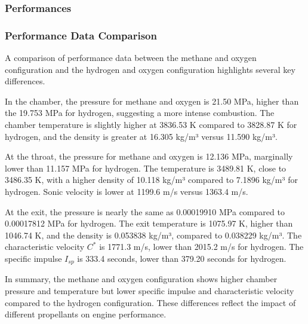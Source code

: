 \subsubsection{Performances}
\subsubsection{Performance Data Comparison}

A comparison of performance data between the methane and oxygen configuration and the hydrogen and oxygen configuration highlights several key differences.

In the chamber, the pressure for methane and oxygen is 21.50 MPa, higher than the 19.753 MPa for hydrogen, suggesting a more intense combustion. The chamber temperature is slightly higher at 3836.53 K compared to 3828.87 K for hydrogen, and the density is greater at 16.305 kg/m³ versus 11.590 kg/m³.

At the throat, the pressure for methane and oxygen is 12.136 MPa, marginally lower than 11.157 MPa for hydrogen. The temperature is 3489.81 K, close to 3486.35 K, with a higher density of 10.118 kg/m³ compared to 7.1896 kg/m³ for hydrogen. Sonic velocity is lower at 1199.6 m/s versus 1363.4 m/s.

At the exit, the pressure is nearly the same as 0.00019910 MPa compared to 0.00017812 MPa for hydrogen. The exit temperature is 1075.97 K, higher than 1046.74 K, and the density is 0.053838 kg/m³, compared to 0.038229 kg/m³. The characteristic velocity \( C^* \) is 1771.3 m/s, lower than 2015.2 m/s for hydrogen. The specific impulse \( I_{sp} \) is 333.4 seconds, lower than 379.20 seconds for hydrogen.

In summary, the methane and oxygen configuration shows higher chamber pressure and temperature but lower specific impulse and characteristic velocity compared to the hydrogen configuration. These differences reflect the impact of different propellants on engine performance.


